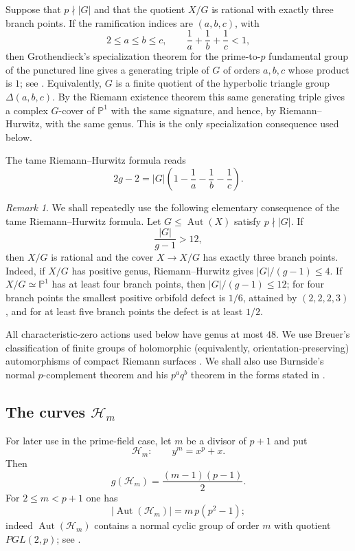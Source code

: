 \documentclass[11pt]{amsart}
\theoremstyle{remark}
\newtheorem{remark}[theorem]{Remark}
\newcommand{\Aut}{\operatorname{Aut}}
\newcommand{\PP}{\mathbb P}
\newcommand{\cH}{\mathcal H}
\begin{document}
Suppose that $p\nmid|G|$ and that the quotient $X/G$ is rational with
exactly three branch points.  If the ramification indices are
$(a,b,c)$, with
\[
       2\le a\le b\le c,\qquad
       \frac1a+\frac1b+\frac1c<1,
\]
then Grothendieck's specialization theorem for the prime-to-$p$
fundamental group of the punctured line gives a generating triple of $G$
of orders $a,b,c$ whose product is $1$; see
\cite[Expos\'e~XIII, Corollaire~2.12]{SGA1}.  Equivalently, $G$ is a
finite quotient of the hyperbolic triangle group $\Delta(a,b,c)$.  By the
Riemann existence theorem this same generating triple gives a complex
$G$-cover of $\PP^1$ with the same signature, and hence, by
Riemann--Hurwitz, with the same genus.  This is the only specialization
consequence used below.

The tame Riemann--Hurwitz formula reads
\begin{equation}\label{eq:triangleRH}
  2g-2
   =|G|\left(1-\frac1a-\frac1b-\frac1c\right).
\end{equation}

\begin{remark}\label{rem:threebranch}
We shall repeatedly use the following elementary consequence of the tame
Riemann--Hurwitz formula.  Let $G\le\Aut(X)$ satisfy $p\nmid|G|$. If
\[
        \frac{|G|}{g-1}>12,
\]
then $X/G$ is rational and the cover $X\to X/G$ has exactly three branch
points.  Indeed, if $X/G$ has positive genus, Riemann--Hurwitz gives
$|G|/(g-1)\le4$.  If $X/G\simeq\PP^1$ has at least four branch points,
then $|G|/(g-1)\le12$; for four branch points the smallest positive
orbifold defect is $1/6$, attained by $(2,2,2,3)$, and for at least five
branch points the defect is at least $1/2$.
\end{remark}

All characteristic-zero actions used below have genus at most $48$.
We use Breuer's classification of finite groups of holomorphic
(equivalently, orientation-preserving) automorphisms of compact Riemann
surfaces \cite[Chapter~5 and the summary table on p.~91]{Breuer}.
We shall also use Burnside's normal $p$-complement theorem and his
$p^a q^b$ theorem in the forms stated in
\cite[Theorems~5.13 and~7.8]{Isaacs}.

\subsection{\texorpdfstring{The curves $\cH_m$}{The curves Hm}}

For later use in the prime-field case, let $m$ be a divisor of $p+1$ and put
\[
            \cH_m:\qquad y^m=x^p+x .
\]
Then
\begin{equation}\label{eq:Hmgenus}
            g(\cH_m)=\frac{(m-1)(p-1)}2.
\end{equation}
For $2\le m<p+1$ one has
\begin{equation}\label{eq:Hmaut}
            |\Aut(\cH_m)|=m\,p(p^2-1);
\end{equation}
indeed $\Aut(\cH_m)$ contains a normal cyclic group of order $m$ with
quotient $PGL(2,p)$; see \cite[Lemma~2.3]{BMT}.
\end{document}
